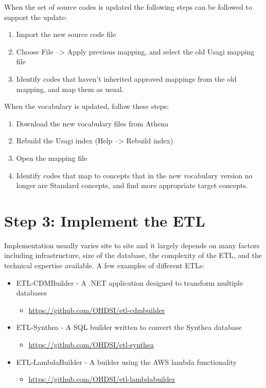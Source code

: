 \documentclass[11pt]{book}
\providecommand{\tightlist}{%
  \setlength{\itemsep}{0pt}\setlength{\parskip}{0pt}}
\theoremstyle{definition}
\theoremstyle{definition}
\theoremstyle{definition}
\theoremstyle{remark}
\begin{document}
When the set of source codes is updated the following steps can be followed to support the update:

\begin{enumerate}
\def\labelenumi{\arabic{enumi}.}
\tightlist
\item
  Import the new source code file
\item
  Choose File --\textgreater{} Apply previous mapping, and select the old Usagi mapping file
\item
  Identify codes that haven't inherited approved mappings from the old mapping, and map them as usual.
\end{enumerate}

When the vocabulary is updated, follow these steps:

\begin{enumerate}
\def\labelenumi{\arabic{enumi}.}
\tightlist
\item
  Download the new vocabulary files from Athena
\item
  Rebuild the Usagi index (Help --\textgreater{} Rebuild index)
\item
  Open the mapping file
\item
  Identify codes that map to concepts that in the new vocabulary version no longer are Standard concepts, and find more appropriate target concepts.
\end{enumerate}

\hypertarget{step-3-implement-the-etl}{%
\section{Step 3: Implement the ETL}\label{step-3-implement-the-etl}}

Implementation usually varies site to site and it largely depends on many factors including infrastructure, size of the database, the complexity of the ETL, and the technical expertise available. A few examples of different ETLs:

\begin{itemize}
\tightlist
\item
  ETL-CDMBuilder - A .NET application designed to transform multiple databases

  \begin{itemize}
  \tightlist
  \item
    \url{https://github.com/OHDSI/etl-cdmbuilder}
  \end{itemize}
\item
  ETL-Synthea - A SQL builder written to convert the Synthea database

  \begin{itemize}
  \tightlist
  \item
    \url{https://github.com/OHDSI/etl-synthea}
  \end{itemize}
\item
  ETL-LambdaBuilder - A builder using the AWS lambda functionality

  \begin{itemize}
  \tightlist
  \item
    \url{https://github.com/OHDSI/etl-lambdabuilder}
  \end{itemize}
\end{itemize}
\end{document}
